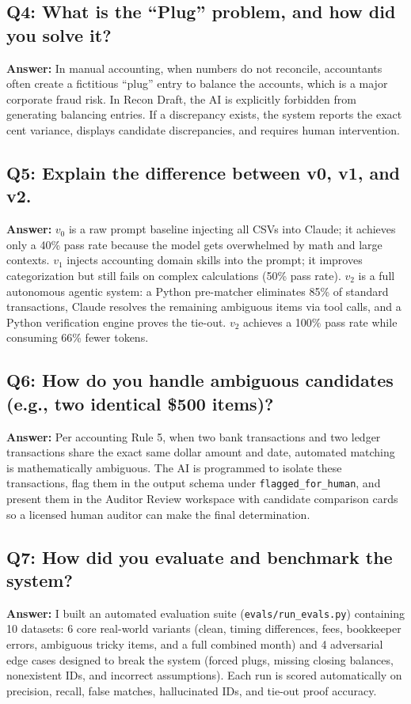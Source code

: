 \documentclass[10pt,a4paper]{article}
\begin{document}
\subsection{Q4: What is the ``Plug'' problem, and how did you solve it?}
\textbf{Answer:} In manual accounting, when numbers do not reconcile, accountants often create a fictitious ``plug'' entry to balance the accounts, which is a major corporate fraud risk. In Recon Draft, the AI is explicitly forbidden from generating balancing entries. If a discrepancy exists, the system reports the exact cent variance, displays candidate discrepancies, and requires human intervention.

\subsection{Q5: Explain the difference between v0, v1, and v2.}
\textbf{Answer:} $v_0$ is a raw prompt baseline injecting all CSVs into Claude; it achieves only a 40\% pass rate because the model gets overwhelmed by math and large contexts. $v_1$ injects accounting domain skills into the prompt; it improves categorization but still fails on complex calculations (50\% pass rate). $v_2$ is a full autonomous agentic system: a Python pre-matcher eliminates 85\% of standard transactions, Claude resolves the remaining ambiguous items via tool calls, and a Python verification engine proves the tie-out. $v_2$ achieves a 100\% pass rate while consuming 66\% fewer tokens.

\subsection{Q6: How do you handle ambiguous candidates (e.g., two identical \$500 items)?}
\textbf{Answer:} Per accounting Rule 5, when two bank transactions and two ledger transactions share the exact same dollar amount and date, automated matching is mathematically ambiguous. The AI is programmed to isolate these transactions, flag them in the output schema under \texttt{flagged\_for\_human}, and present them in the Auditor Review workspace with candidate comparison cards so a licensed human auditor can make the final determination.

\subsection{Q7: How did you evaluate and benchmark the system?}
\textbf{Answer:} I built an automated evaluation suite (\texttt{evals/run\_evals.py}) containing 10 datasets: 6 core real-world variants (clean, timing differences, fees, bookkeeper errors, ambiguous tricky items, and a full combined month) and 4 adversarial edge cases designed to break the system (forced plugs, missing closing balances, nonexistent IDs, and incorrect assumptions). Each run is scored automatically on precision, recall, false matches, hallucinated IDs, and tie-out proof accuracy.
\end{document}
